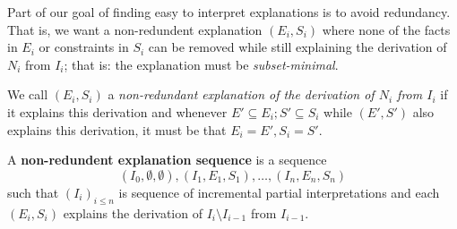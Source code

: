 Part of our goal of finding easy to interpret explanations is to avoid redundancy. 
That is, we want a non-redundent explanation $(E_i,S_i)$ where none of the facts in $E_i$ or constraints in $S_i$ can be removed while still explaining the derivation of $N_i$ from $I_i$; that is: the explanation must be \textit{subset-minimal}. 
\begin{definition}
 We call $(E_i,S_i)$ a \emph{non-redundant explanation of  the derivation of $N_i$ from $I_i$} if it explains this derivation and whenever $E'\subseteq E_i; S'\subseteq S_i$ while $(E',S')$ also explains this derivation, it must be that $E_i=E', S_i=S'$. 
\end{definition}

\begin{definition} \label{def:nonred}
A \textbf{non-redundent explanation sequence} is a sequence 
\[(I_0,\emptyset,\emptyset), (I_1,E_1,S_1), \dots ,(I_n,E_n,S_n)\]
such that $(I_i)_{i\leq n}$ is sequence of incremental partial interpretations and each $(E_i,S_i)$ explains the derivation of $I_i\setminus I_{i-1}$ from $I_{i-1}$.
\end{definition} 





